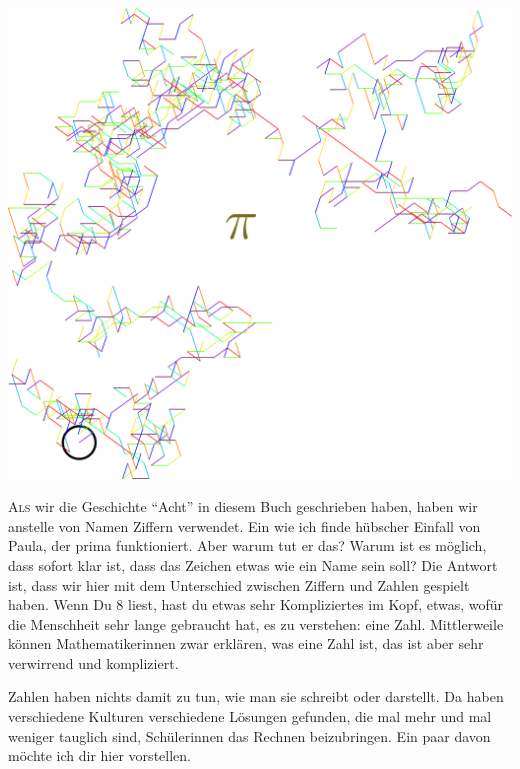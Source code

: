 ﻿
\thispagestyle{empty}
\begin{center}
\includegraphics[width=\textwidth]{./bilder/pi.png}
\end{center}
\vspace*{\fill}
{\centering\fontsize{50}{48} \color{farbe}\par}
\newpage
\lettrine[lines=3, lhang=.2, loversize=.25, lraise=0.05, findent=0.1em,nindent=0em]{A}{ls} wir die Geschichte \enquote{Acht} in diesem Buch geschrieben haben, haben wir anstelle von Namen Ziffern verwendet. Ein wie ich finde hübscher Einfall von Paula, der prima funktioniert. Aber warum tut er das? Warum ist es möglich, dass sofort klar ist, dass das Zeichen  etwas wie ein Name sein soll? Die Antwort ist, dass wir hier mit dem Unterschied zwischen Ziffern und Zahlen gespielt haben. Wenn Du 8 liest, hast du etwas sehr Kompliziertes im Kopf, etwas, wofür die Menschheit sehr lange gebraucht hat, es zu verstehen: eine Zahl. Mittlerweile können Mathematikerinnen zwar erklären, was eine Zahl ist, das ist aber sehr verwirrend und kompliziert.

Zahlen haben nichts damit zu tun, wie man sie schreibt oder darstellt. Da haben verschiedene Kulturen verschiedene Lösungen gefunden, die mal mehr und mal weniger tauglich sind, Schülerinnen das Rechnen beizubringen. Ein paar davon möchte ich dir hier vorstellen.

